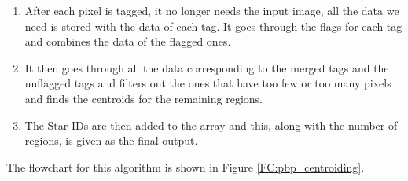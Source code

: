 \documentclass[../../main.tex]{subfiles}
\begin{document}
\begin{enumerate}
\begin{enumerate}
\begin{enumerate}
        \end{enumerate}
        \item If only one of them is bright, the pixel is tagged with the corresponding tag and the data is added to the data of that tag
        \item If none of them are bright, it checks the pixel to the right and the one to the right of the one to the north\footnote{This is done to reduce the unnecessary creation of new tags and the resulting conflicts between tags that will eventually get connected at some pixel. The testing done so far has suggested that this is fairly effective in cutting down on the use of flags and the resulting merge.}.
            \begin{itemize}
                \item If both of those are bright, the pixel is tagged with the tag of the pixel to the right of the one to the north. 
                \item If not, the pixel is assigned a new tag and the data is added to the corresponding tag's data
            \end{itemize}
    \end{enumerate}
    \item After each pixel is tagged, it no longer needs the input image, all the data we need is stored with the data of each tag. It goes through the flags for each tag and combines the data of the flagged ones. 
    \item It then goes through all the data corresponding to the merged tags and the unflagged tags and filters out the ones that have too few or too many pixels and finds the centroids for the remaining regions.
    \item The Star IDs are then added to the array and this, along with the number of regions, is given as the final output.
\end{enumerate}
The flowchart for this algorithm is shown in Figure \ref{FC:pbp_centroiding}.
\end{document}
